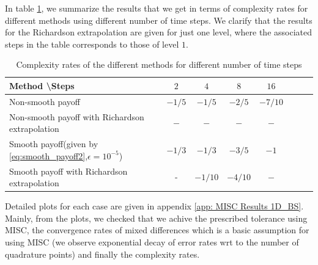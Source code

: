 \documentclass[11pt]{article}
\begin{document}








In table \ref{table: Complexity rates of the different methods for different number of time steps}, we summarize the results that we get in terms of complexity rates for different methods using different number of time steps. We clarify that the results for the Richardson extrapolation are given for just one level, where the associated steps in the table corresponds to those of level $1$.
\begin{table}[h!]
	\centering
	\begin{tabular}{l*{6}{c}r}
		Method \textbackslash  Steps            & $2$ & $4$ & $8$ & $16$  \\
		\hline
		Non-smooth payoff   & $-1/5$ & $-1/5$ & $-2/5$ & $-7/10$  \\
		Non-smooth payoff with Richardson  extrapolation    & $-$ & $-$ & $-$ & $-$  \\
		Smooth payoff(given by \eqref{eq:smooth_payoff2},$\epsilon=10^{-5}$)          & $-1/3$ &$-1/3$ &  $-3/5$ &  $-1$ \\
		Smooth payoff with Richardson  extrapolation      & - & $-1/10$  & $-4/10$ & $-$  \\
		\hline
	\end{tabular}
	\caption{Complexity rates of the different methods for different number of time steps}
	\label{table: Complexity rates of the different methods for different number of time steps}
\end{table}	

Detailed plots for each case are given in appendix \ref{app: MISC Results 1D_BS}. Mainly, from the plots, 
we checked  that we achive the prescribed tolerance using MISC, the convergence rates of mixed differences which is a basic assumption for using MISC (we observe exponential decay of error rates wrt to the number of quadrature points) and finally the complexity rates.
\end{document}
